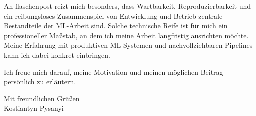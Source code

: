 \documentclass[11pt,a4paper]{article}
\begin{document}
An flaschenpost reizt mich besonders, dass Wartbarkeit, Reproduzierbarkeit und ein reibungsloses Zusammenspiel von Entwicklung und Betrieb zentrale Bestandteile der ML-Arbeit sind. Solche technische Reife ist für mich ein professioneller Maßstab, an dem ich meine Arbeit langfristig ausrichten möchte. Meine Erfahrung mit produktiven ML-Systemen und nachvollziehbaren Pipelines kann ich dabei konkret einbringen.

Ich freue mich darauf, meine Motivation und meinen möglichen Beitrag persönlich zu erläutern.

Mit freundlichen Grüßen\\[0.8em]
Kostiantyn Pysanyi
\end{document}
